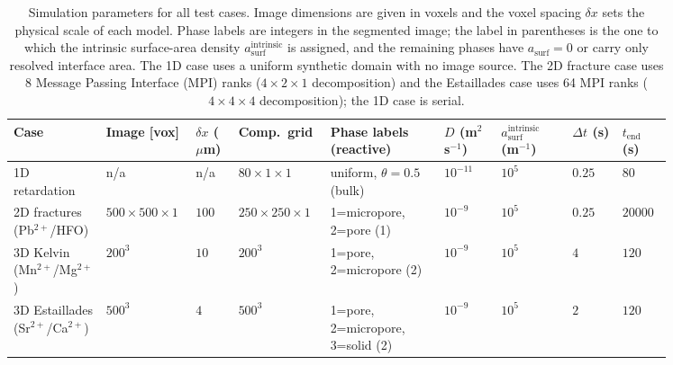 \begin{table}[htbp]
    \centering
    \caption{Simulation parameters for all test cases. Image dimensions are
    given in voxels and the voxel spacing $\delta x$ sets the physical scale of
    each model. Phase labels are integers in the segmented image; the label in
    parentheses is the one to which the intrinsic surface-area density
    $a_{\mathrm{surf}}^{\mathrm{intrinsic}}$ is assigned, and the remaining phases have
    $a_{\mathrm{surf}} = 0$ or carry only resolved interface area. The 1D case
    uses a uniform synthetic domain with no image source.
    The 2D fracture case uses 8 Message Passing Interface (MPI) ranks
    ($4\times2\times1$ decomposition) and the Estaillades case uses 64 MPI ranks
    ($4\times4\times4$ decomposition); the 1D case is serial.}
    \label{tab:simParams}
    \scriptsize
    \setlength{\tabcolsep}{2pt}
    \begin{tabular}{@{}p{0.13\linewidth}p{0.09\linewidth}p{0.06\linewidth}p{0.09\linewidth}p{0.16\linewidth}p{0.08\linewidth}p{0.10\linewidth}p{0.07\linewidth}p{0.07\linewidth}@{}}
        \toprule
        Case
            & Image [vox]
            & $\delta x$ ($\mu$m)
            & Comp.\ grid
            & Phase labels (reactive)
            & $D$ (m$^{2}$\,s$^{-1}$)
            & $a_{\mathrm{surf}}^{\mathrm{intrinsic}}$ (m$^{-1}$)
            & $\Delta t$ (s)
            & $t_{\mathrm{end}}$ (s) \\
        \midrule
        1D retardation
            & n/a
            & n/a
            & $80\times1\times1$
            & uniform, $\theta=0.5$ (bulk)
            & $10^{-11}$
            & $10^{5}$
            & $0.25$
            & $80$ \\
        2D fractures (Pb$^{2+}$/HFO)
            & $500\times500\times1$
            & $100$
            & $250\times250\times1$
            & 1=micropore, 2=pore \; (1)
            & $10^{-9}$
            & $10^{5}$
            & $0.25$
            & $20000$ \\
        3D Kelvin (Mn$^{2+}$/Mg$^{2+}$)
            & $200^{3}$
            & $10$
            & $200^{3}$
            & 1=pore, 2=micropore \; (2)
            & $10^{-9}$
            & $10^{5}$
            & $4$
            & $120$ \\
        3D Estaillades (Sr$^{2+}$/Ca$^{2+}$)
            & $500^{3}$
            & $4$
            & $500^{3}$
            & 1=pore, 2=micropore, 3=solid \; (2)
            & $10^{-9}$
            & $10^{5}$
            & $2$
            & $120$ \\
        \bottomrule
    \end{tabular}
\end{table}

